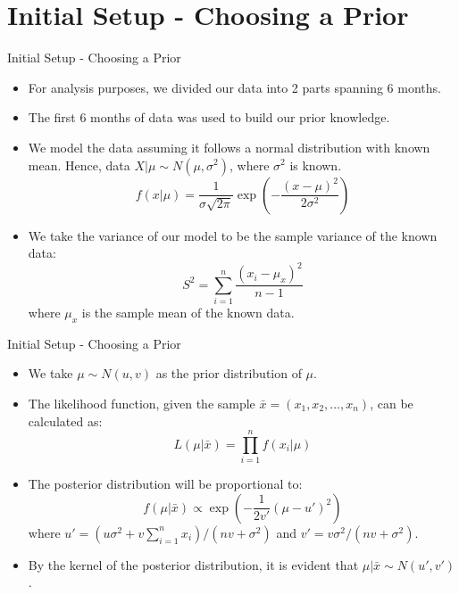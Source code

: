\section{Initial Setup - Choosing a Prior}

\begin{frame}{Initial Setup - Choosing a Prior}

\begin{itemize}
  \item For analysis purposes, we divided our data into 2 parts spanning 6 months.
  \item The first 6 months of data was used to build our prior knowledge.
  \item We model the data assuming it follows a normal distribution with known mean.
  Hence, data $X | \mu \sim N(\mu, \sigma^2)$, where $\sigma^2$ is known.
  $$ f(x | \mu) = \frac{1}{\sigma \sqrt{2\pi}} \exp\left(-\frac{(x - \mu)^2}{2\sigma^2}\right) $$
  \item We take the variance of our model to be the sample variance of the known data:
  $$ S^2 = \sum_{i = 1}^{n} \frac{(x_i - \mu_x)^2}{n - 1} $$
  where $\mu_x$ is the sample mean of the known data.
\end{itemize}

\end{frame}


\begin{frame}{Initial Setup - Choosing a Prior}

\begin{itemize}
  \item We take $\mu \sim N(u, v)$ as the prior distribution of $\mu$.
  \item The likelihood function, given the sample $\bar{x} = (x_1, x_2, \dots, x_n)$, can be calculated as: $$ L(\mu | \bar{x}) = \prod_{i = 1}^{n} f(x_i | \mu)$$
  \item The posterior distribution will be proportional to:
  $$ f(\mu | \bar{x}) \propto \exp\left(-\frac{1}{2v'} (\mu - u')^2\right)$$
  where $u' = \left(u \sigma^2 + v \sum_{i = 1}^{n} x_i\right) / (n v + \sigma^2)$ and $v' = v \sigma^2/(n v + \sigma^2)$.
  \item By the kernel of the posterior distribution, it is evident that $\mu | \bar{x} \sim N(u', v')$.
\end{itemize}

\end{frame}
